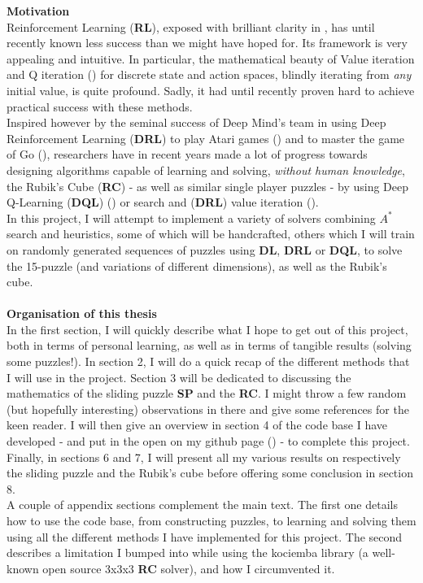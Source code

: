 
\noindent
\textbf{Motivation}
\label{Abstract}
\\
Reinforcement Learning (\textbf{RL}), exposed with brilliant clarity in \cite{Sutton1998}, has until recently known less success than we might have hoped for. Its framework is very appealing and intuitive. In particular, the mathematical beauty of Value iteration and Q iteration (\cite{WatkinsThesis}) for discrete state and action spaces, blindly iterating from \textit{any} initial value, is quite profound. Sadly, it had until recently proven hard to achieve practical success with these methods.
\\
Inspired however by the seminal success of Deep Mind's team in using Deep Reinforcement Learning (\textbf{DRL}) to play Atari games (\cite{Mnih2013})  and to master the game of Go (\cite{AlphaGo}), researchers have in recent years made a lot of progress towards designing algorithms capable of learning and solving, \textit{without human knowledge}, the Rubik's Cube (\textbf{RC}) - as well as similar single player puzzles - by using Deep Q-Learning (\textbf{DQL})  (\cite{DBLP:journals/corr/abs-1805-07470}) or search and (\textbf{DRL}) value iteration (\cite{https://doi.org/10.48550/arxiv.1805.07470}).
\\
In this project, I will attempt to implement a variety of solvers combining $A^{*}$ search and heuristics, some of which will be handcrafted, others which I will train on randomly generated sequences of puzzles using \textbf{DL}, \textbf{DRL} or \textbf{DQL}, to solve the 15-puzzle (and variations of different dimensions), as well as the Rubik's cube.
\\
\\
\textbf{Organisation of this thesis}
\\
In the first section, I will quickly describe what I hope to get out of this project, both in terms of personal learning, as well as in terms of tangible results (solving some puzzles!). In section 2, I will do a quick recap of the different methods that I will use in the project. Section 3 will be dedicated to discussing the mathematics of the sliding puzzle \textbf{SP} and the \textbf{RC}. I might throw a few random (but hopefully interesting) observations in there and give some references for the keen reader. I will then give an overview in section 4 of the code base I have developed - and put in the open on my github page (\cite{FB}) - to complete this project. Finally, in sections 6 and 7, I will present all my various results on respectively the sliding puzzle and the Rubik's cube before offering some conclusion in section 8.
\\
A couple of appendix sections complement the main text. The first one details how to use the code base, from constructing puzzles, to learning and solving them using all the different methods I have implemented for this project. The second describes a limitation I bumped into while using the kociemba library (a well-known open source 3x3x3 \textbf{RC} solver), and how I circumvented it.

